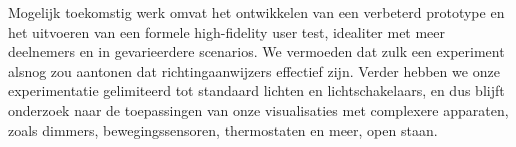 Mogelijk toekomstig werk omvat het ontwikkelen van een verbeterd prototype en het uitvoeren van een formele high-fidelity user test, idealiter met meer deelnemers en in gevarieerdere scenarios. We vermoeden dat zulk een experiment alsnog zou aantonen dat richtingaanwijzers effectief zijn. Verder hebben we onze experimentatie gelimiteerd tot standaard lichten en lichtschakelaars, en dus blijft onderzoek naar de toepassingen van onze visualisaties met complexere apparaten, zoals dimmers, bewegingssensoren, thermostaten en meer, open staan.
